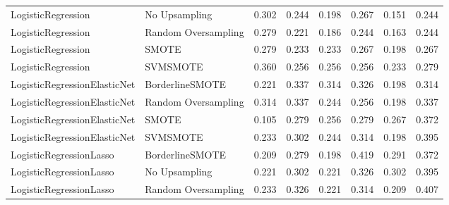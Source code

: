 \begin{tabular}{llllllll}
          LogisticRegression &       No Upsampling &     0.302 &                     0.244 &                 0.198 &                  0.267 &                                   0.151 &     0.244 \\
          LogisticRegression & Random Oversampling &     0.279 &                     0.221 &                 0.186 &                  0.244 &                                   0.163 &     0.244 \\
          LogisticRegression &               SMOTE &     0.279 &                     0.233 &                 0.233 &                  0.267 &                                   0.198 &     0.267 \\
          LogisticRegression &            SVMSMOTE &     0.360 &                     0.256 &                 0.256 &                  0.256 &                                   0.233 &     0.279 \\
LogisticRegressionElasticNet &     BorderlineSMOTE &     0.221 &                     0.337 &                 0.314 &                  0.326 &                                   0.198 &     0.314 \\
LogisticRegressionElasticNet & Random Oversampling &     0.314 &                     0.337 &                 0.244 &                  0.256 &                                   0.198 &     0.337 \\
LogisticRegressionElasticNet &               SMOTE &     0.105 &                     0.279 &                 0.256 &                  0.279 &                                   0.267 &     0.372 \\
LogisticRegressionElasticNet &            SVMSMOTE &     0.233 &                     0.302 &                 0.244 &                  0.314 &                                   0.198 &     0.395 \\
     LogisticRegressionLasso &     BorderlineSMOTE &     0.209 &                     0.279 &                 0.198 &                  0.419 &                                   0.291 &     0.372 \\
     LogisticRegressionLasso &       No Upsampling &     0.221 &                     0.302 &                 0.221 &                  0.326 &                                   0.302 &     0.395 \\
     LogisticRegressionLasso & Random Oversampling &     0.233 &                     0.326 &                 0.221 &                  0.314 &                                   0.209 &     0.407 \\

\end{tabular}
